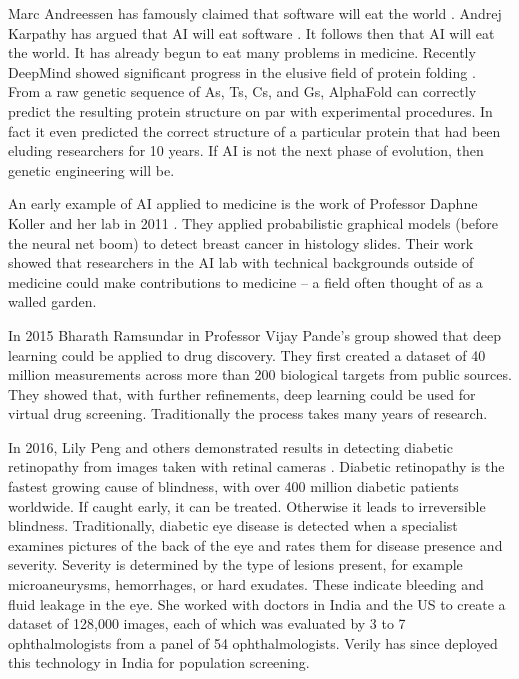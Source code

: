Marc Andreessen has famously claimed that software will eat the world \cite{andreessen2011software}.  Andrej Karpathy has argued that AI will eat software \cite{karpathy2017software}.  It follows then that AI will eat the world.  It has already begun to eat many problems in medicine.  Recently DeepMind showed significant progress in the elusive field of protein folding \cite{senior2020improved}.  From a raw genetic sequence of As, Ts, Cs, and Gs, AlphaFold can correctly predict the resulting protein structure on par with experimental procedures.  In fact it even predicted the correct structure of a particular protein that had been eluding researchers for 10 years.  If AI is not the next phase of evolution, then genetic engineering will be.  

An early example of AI applied to medicine is the work of Professor Daphne Koller and her lab in 2011 \cite{beck2011systematic}.  They applied probabilistic graphical models (before the neural net boom) to detect breast cancer in histology slides.  Their work showed that researchers in the AI lab with technical backgrounds outside of medicine could make contributions to medicine -- a field often thought of as a walled garden.  

In 2015 Bharath Ramsundar in Professor Vijay Pande's group showed that deep learning could be applied to drug discovery.  They first created a dataset of 40 million measurements across more than 200 biological targets from public sources.  They showed that, with further refinements, deep learning could be used for virtual drug screening.  Traditionally the process takes many years of research.

In 2016, Lily Peng and others demonstrated results in detecting diabetic retinopathy from images taken with retinal cameras \cite{gulshan2016development}.  Diabetic retinopathy is the fastest growing cause of blindness, with over 400 million diabetic patients worldwide.  If caught early, it can be treated.  Otherwise it leads to irreversible blindness.  Traditionally, diabetic eye disease is detected when a specialist examines pictures of the back of the eye and rates them for disease presence and severity. Severity is determined by the type of lesions present, for example microaneurysms, hemorrhages, or hard exudates.  These indicate bleeding and fluid leakage in the eye.  She worked with doctors in India and the US to create a dataset of 128,000 images, each of which was evaluated by 3 to 7 ophthalmologists from a panel of 54 ophthalmologists.  Verily has since deployed this technology in India for population screening.

